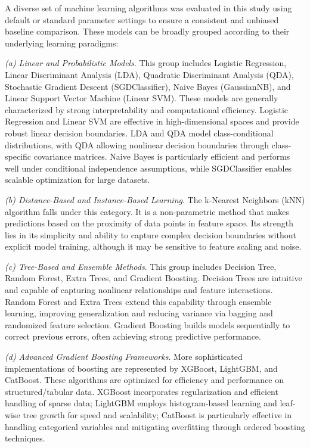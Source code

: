 \documentclass[pdflatex,sn-vancouver-num]{sn-jnl}
\begin{document}
A diverse set of machine learning algorithms was evaluated in this study using default or standard parameter settings to ensure a consistent and unbiased baseline comparison. These models can be broadly grouped according to their underlying learning paradigms:

\textit{(a) Linear and Probabilistic Models}.
This group includes Logistic Regression, Linear Discriminant Analysis (LDA), Quadratic Discriminant Analysis (QDA), Stochastic Gradient Descent (SGDClassifier), Naive Bayes (GaussianNB), and Linear Support Vector Machine (Linear SVM). These models are generally characterized by strong interpretability and computational efficiency. Logistic Regression and Linear SVM are effective in high-dimensional spaces and provide robust linear decision boundaries. LDA and QDA model class-conditional distributions, with QDA allowing nonlinear decision boundaries through class-specific covariance matrices. Naive Bayes is particularly efficient and performs well under conditional independence assumptions, while SGDClassifier enables scalable optimization for large datasets.

\textit{(b) Distance-Based and Instance-Based Learning}.
The k-Nearest Neighbors (kNN) algorithm falls under this category. It is a non-parametric method that makes predictions based on the proximity of data points in feature space. Its strength lies in its simplicity and ability to capture complex decision boundaries without explicit model training, although it may be sensitive to feature scaling and noise.

\textit{(c) Tree-Based and Ensemble Methods}.
This group includes Decision Tree, Random Forest, Extra Trees, and Gradient Boosting. Decision Trees are intuitive and capable of capturing nonlinear relationships and feature interactions. Random Forest and Extra Trees extend this capability through ensemble learning, improving generalization and reducing variance via bagging and randomized feature selection. Gradient Boosting builds models sequentially to correct previous errors, often achieving strong predictive performance.

\textit{(d) Advanced Gradient Boosting Frameworks}.
More sophisticated implementations of boosting are represented by XGBoost, LightGBM, and CatBoost. These algorithms are optimized for efficiency and performance on structured/tabular data. XGBoost incorporates regularization and efficient handling of sparse data; LightGBM employs histogram-based learning and leaf-wise tree growth for speed and scalability; CatBoost is particularly effective in handling categorical variables and mitigating overfitting through ordered boosting techniques.
\end{document}
